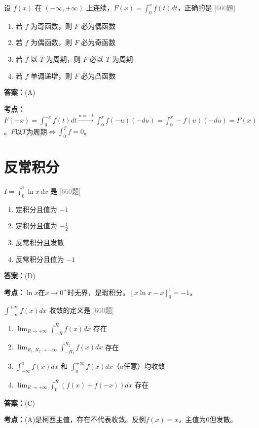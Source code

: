 \documentclass[12pt,a4paper]{ctexbook}
\newcommand{\src}[1]{\hfill\textcolor{gray}{\small\textsf{[#1]}}}
\newcommand{\ans}[1]{\begin{answerbox}\textbf{答案：}#1\end{answerbox}}
\newcommand{\kpt}[1]{\textbf{考点：}#1}
\begin{document}
\begin{exercise}[660题·变限积分奇偶性]
设 $f(x)$ 在 $(-\infty,+\infty)$ 上连续，$F(x)=\int_0^x f(t)dt$，正确的是 \hfill\src{660题}
\begin{enumerate}[label=(\Alph*),nosep]
  \item 若 $f$ 为奇函数，则 $F$ 必为偶函数
  \item 若 $f$ 为偶函数，则 $F$ 必为奇函数
  \item 若 $f$ 以 $T$ 为周期，则 $F$ 必以 $T$ 为周期
  \item 若 $f$ 单调递增，则 $F$ 必为凸函数
\end{enumerate}
\end{exercise}
\ans{(A)}
\kpt{$F(-x)=\int_0^{-x}f(t)dt\xrightarrow{u=-t}\int_0^x f(-u)(-du)=\int_0^x -f(u)(-du)=F(x)$。$F$以$T$为周期$\iff\int_0^T f=0$。}

\section{反常积分}

\begin{exercise}[660题·反常积分的识别]
$I=\int_0^1\ln x\,dx$ 是 \hfill\src{660题}
\begin{enumerate}[label=(\Alph*),nosep]
  \item 定积分且值为 $-1$
  \item 定积分且值为 $-\frac{1}{2}$
  \item 反常积分且发散
  \item 反常积分且值为 $-1$
\end{enumerate}
\end{exercise}
\ans{(D)}
\kpt{$\ln x$在$x\to 0^+$时无界，是瑕积分。$[x\ln x-x]_0^1=-1$。}

\bigskip

\begin{exercise}[660题·反常积分收敛定义]
$\int_{-\infty}^{+\infty}f(x)dx$ 收敛的定义是 \hfill\src{660题}
\begin{enumerate}[label=(\Alph*),nosep]
  \item $\lim_{R\to+\infty}\int_{-R}^{R}f(x)dx$ 存在
  \item $\lim_{R_1,R_2\to+\infty}\int_{-R_1}^{R_2}f(x)dx$ 存在
  \item $\int_{-\infty}^{a}f(x)dx$ 和 $\int_{a}^{+\infty}f(x)dx$（$a$任意）均收敛
  \item $\lim_{R\to+\infty}\int_{0}^{R}(f(x)+f(-x))dx$ 存在
\end{enumerate}
\end{exercise}
\ans{(C)}
\kpt{(A)是柯西主值，存在不代表收敛。反例$f(x)=x$，主值为$0$但发散。}
\end{document}
